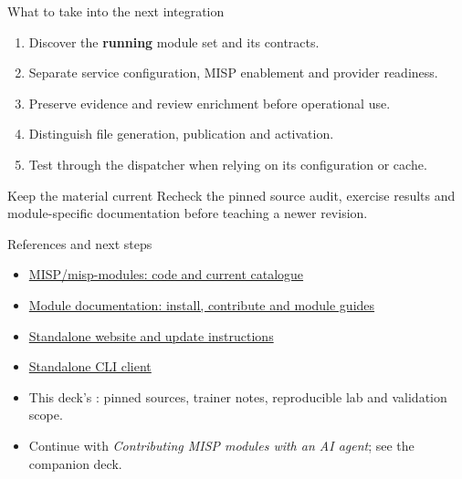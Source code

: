 \begin{frame}{What to take into the next integration}
    \begin{enumerate}
        \item Discover the \textbf{running} module set and its contracts.
        \item Separate service configuration, MISP enablement and provider readiness.
        \item Preserve evidence and review enrichment before operational use.
        \item Distinguish file generation, publication and activation.
        \item Test through the dispatcher when relying on its configuration or cache.
    \end{enumerate}
    \begin{block}{Keep the material current}
        Recheck the pinned source audit, exercise results and module-specific
        documentation before teaching a newer revision.
    \end{block}
\end{frame}

\begin{frame}{References and next steps}
    \begin{itemize}
        \item \href{https://github.com/MISP/misp-modules}{MISP/misp-modules: code and current catalogue}
        \item \href{https://misp.github.io/misp-modules/}{Module documentation: install, contribute and module guides}
        \item \href{https://github.com/MISP/misp-modules/tree/main/website}{Standalone website and update instructions}
        \item \href{https://github.com/MISP/misp-modules-cli}{Standalone CLI client}
        \item This deck's : pinned sources, trainer notes,
        reproducible lab and validation scope.
        \item Continue with \emph{Contributing MISP modules with an AI agent};
        see the companion  deck.
    \end{itemize}
\end{frame}
